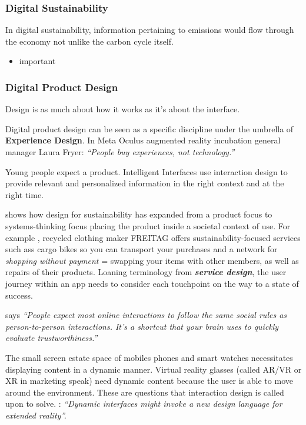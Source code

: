 \documentclass[
  letterpaper,
  DIV=11,
  numbers=noendperiod]{scrartcl}
\providecommand{\tightlist}{%
  \setlength{\itemsep}{0pt}\setlength{\parskip}{0pt}}\usepackage{longtable,booktabs,array}
\begin{document}
\subsubsection{Digital Sustainability}\label{digital-sustainability}

In digital sustainability, information pertaining to emissions would
flow through the economy not unlike the carbon cycle itself.

\begin{itemize}
\tightlist
\item
  \citet{panArtificialIntelligenceDigital2023} important
\end{itemize}

\subsubsection{Digital Product Design}\label{digital-product-design}

Design is as much about how it works as it's about the interface.

Digital product design can be seen as a specific discipline under the
umbrella of \textbf{Experience Design}. In
\citet{michaelabrashInventingFuture2017} Meta Oculus augmented reality
incubation general manager Laura Fryer: \emph{``People buy experiences,
not technology.''}

Young people expect a product. Intelligent Interfaces use interaction
design to provide relevant and personalized information in the right
context and at the right time.

\citet{ceschinEvolutionDesignSustainability2016} shows how design for
sustainability has expanded from a product focus to systems-thinking
focus placing the product inside a societal context of use. For example
\citet{CargoBikeFREITAG}, recycled clothing maker FREITAG offers
sustainability-focused services such ass cargo bikes so you can
transport your purchases and a network for \emph{shopping without
payment} = swapping your items with other members, as well as repairs of
their products. Loaning terminology from \textbf{\emph{service design}},
the user journey within an app needs to consider each touchpoint on the
way to a state of success.

\citet{weinschenk100ThingsEvery2011} says \emph{``People expect most
online interactions to follow the same social rules as person-to-person
interactions. It's a shortcut that your brain uses to quickly evaluate
trustworthiness.''}

The small screen estate space of mobiles phones and smart watches
necessitates displaying content in a dynamic manner. Virtual reality
glasses (called AR/VR or XR in marketing speak) need dynamic content
because the user is able to move around the environment. These are
questions that interaction design is called upon to solve.
\citet{hoangEnterDynamicIsland2022}: \emph{``Dynamic interfaces might
invoke a new design language for extended reality''.}
\end{document}
